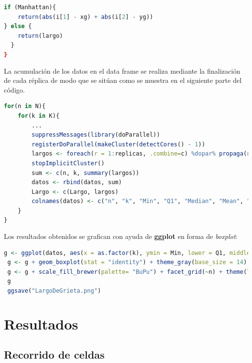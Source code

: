 \documentclass{article}
\begin{document}
\begin{lstlisting}[language=R]
if (Manhattan){
    return(abs(i[1] - xg) + abs(i[2] - yg))
} else {
    return(largo)
  }
}
\end{lstlisting}

\newpage

La acumulaci\'on de los datos en el data frame se realiza mediante la finalizaci\'on de cada r\'eplica de modo que se sit\'uan como se muestra en el siguiente parte del c\'odigo.

\begin{lstlisting}[language=R]
for(n in N){
    for(k in K){
        ...
        suppressMessages(library(doParallel))
        registerDoParallel(makeCluster(detectCores() - 1))
        largos <- foreach(r = 1:replicas, .combine=c) %dopar% propaga(r)
        stopImplicitCluster()
        sum <- c(n, k, summary(largos))
        datos <- rbind(datos, sum)
        Largo <- c(Largo, largos)
        colnames(datos) <- c("n", "k", "Min", "Q1", "Median", "Mean", "Q3", "Max")
    }
}
\end{lstlisting}

Los resultados obtenidos se grafican con ayuda de \textbf{ggplot} en forma de \textit{boxplot}:

\begin{lstlisting}[language=R]
 g <- ggplot(datos, aes(x = as.factor(k), ymin = Min, lower = Q1, middle = Mean, upper = Q3, ymax = Max, fill = as.factor(k)))
 g <- g + geom_boxplot(stat = "identity") + theme_gray(base_size = 14) + labs(x = "Tama\u{F1}o de la zona (n)", y = "Largo de la grieta")
 g <- g + scale_fill_brewer(palette= "BuPu") + facet_grid(~n) + theme(legend.position="none")
 g
 ggsave("LargoDeGrieta.png")
\end{lstlisting}

\newpage

\section{Resultados}

\subsection{Recorrido de celdas}
\end{document}
